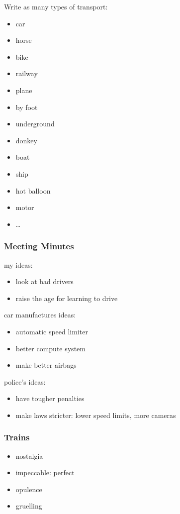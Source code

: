\begin{notation}
    Write as many types of transport:
\end{notation}
\begin{itemize}
    \item car
    \item horse
    \item bike
    \item railway
    \item plane
    \item by foot
    \item underground
    \item donkey
    \item boat
    \item ship
    \item hot balloon
    \item motor
    \item \ldots 
    
\end{itemize}
\subsubsection*{Meeting Minutes}%
\label{subsub*:Meeting-Minutes}
my ideas:
\begin{itemize}
    \item look at bad drivers
    \item raise the age for learning to drive
\end{itemize}
car manufactures ideas:
\begin{itemize}
    \item automatic speed limiter
    \item better compute system
    \item make better airbags
\end{itemize}
police's ideas:
\begin{itemize}
    \item have tougher penalties
    \item make laws stricter: lower speed limits, more cameras
\end{itemize}
\subsubsection*{Trains}%
\label{subsub*:Trains}
\begin{itemize}
    \item nostalgia
    \item impeccable: perfect
    \item opulence
    \item gruelling
\end{itemize}
